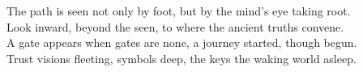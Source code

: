 \documentclass{article}
\begin{document}
\begin{infobox}
The path is seen not only by foot, but by the mind's eye taking root.\\
Look inward, beyond the seen, to where the ancient truths convene.\\
A gate appears when gates are none, a journey started, though begun.\\
Trust visions fleeting, symbols deep, the keys the waking world asleep.
\end{infobox}
\end{document}
